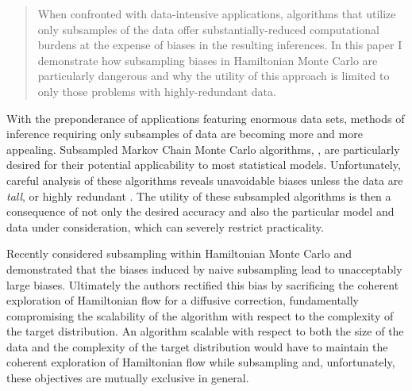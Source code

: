 \documentclass{article}
\begin{document}


\begin{abstract}
When confronted with data-intensive applications, algorithms that utilize only subsamples 
of the data offer substantially-reduced computational burdens at the expense of biases
in the resulting inferences.  In this paper I demonstrate how subsampling biases in 
Hamiltonian Monte Carlo are particularly dangerous and why the utility of this approach
is limited to only those problems with highly-redundant data.
\end{abstract}

With the preponderance of applications featuring enormous data sets,
methods of inference requiring only subsamples of data are becoming 
more and more appealing.  Subsampled Markov Chain Monte Carlo 
algorithms, \cite{NeiswangerEtAl:2013, WellingEtAl:2011}, are particularly
desired for their potential applicability to most statistical models.  Unfortunately, 
careful analysis of these algorithms reveals unavoidable biases unless 
the data are \textit{tall}, or highly redundant 
\cite{BardenetEtAl:2014, TehEtAl:2014, VollmerEtAl:2015}.  
The utility of these subsampled algorithms is then a consequence 
of not only the desired accuracy and also the particular model and data
under consideration, which can severely restrict practicality.

Recently \cite{ChenEtAl:2014} considered subsampling within Hamiltonian
Monte Carlo \cite{DuaneEtAl:1987, Neal:2011, BetancourtEtAl:2014} and 
demonstrated that the biases induced by naive subsampling lead to 
unacceptably large biases.  Ultimately the authors rectified this bias by
sacrificing the coherent exploration of Hamiltonian flow for a diffusive correction, 
fundamentally compromising the scalability of the algorithm with respect to
the complexity of the target distribution.  An algorithm scalable with respect to
both the size of the data and the complexity of the target distribution would
have to maintain the coherent exploration of Hamiltonian flow while 
subsampling and, unfortunately, these objectives are mutually exclusive in
general.
\end{document}
